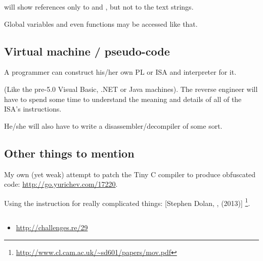 \IDA{} will show references only to  and , 
but not to the text strings.

Global variables and even functions may be accessed like that.

\subsection{Virtual machine / pseudo-code}

A programmer can construct his/her own \ac{PL} or \ac{ISA} and interpreter for it.

(Like the pre-5.0 Visual Basic, .NET or Java machines).
The reverse engineer will have to spend some time to understand the meaning 
and details of all of the \ac{ISA}'s instructions.

He/she will also have to write a disassembler/decompiler of some sort.

\subsection{Other things to mention}

My own (yet weak) attempt to patch the Tiny C compiler to produce obfuscated code: \url{http://go.yurichev.com/17220}.

Using the \MOV 
instruction for really complicated things: 
[Stephen Dolan, , (2013)]
\footnote{\AlsoAvailableAs \url{http://www.cl.cam.ac.uk/~sd601/papers/mov.pdf}}. 

\subsection{\Exercise}

\begin{itemize}
	\item \url{http://challenges.re/29}
\end{itemize}

